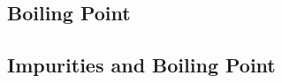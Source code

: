 \begin{multicols}{2}
%
%


\section*{Boiling Point}


\subsection{Impurities and Boiling Point}



\end{multicols}
